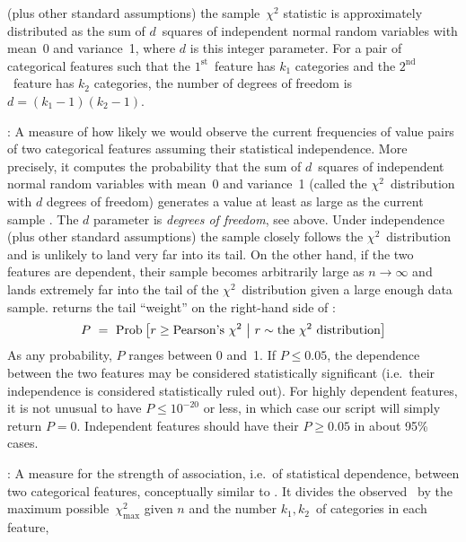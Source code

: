 \begin{Description}
(plus other standard assumptions) the sample~$\chi^2$ statistic is approximately distributed as the
sum of $d$~squares of independent normal random variables with mean~0 and variance~1, where $d$ is
this integer parameter.  For a pair of categorical features such that the $1^{\textrm{st}}$~feature
has $k_1$ categories and the $2^{\textrm{nd}}$~feature has $k_2$ categories, the number of degrees
of freedom is $d = (k_1 - 1)(k_2 - 1)$.
\item[\it\NameStatPChi]:
A measure of how likely we would observe the current frequencies of value pairs of two categorical
features assuming their statistical independence.  More precisely, it computes the probability that
the sum of $d$~squares of independent normal random variables with mean~0 and variance~1
(called the $\chi^2$~distribution with $d$ degrees of freedom) generates a value at least as large
as the current sample \NameStatChi.  The $d$ parameter is \emph{degrees of freedom}, see above.
Under independence (plus other standard assumptions) the sample \NameStatChi{} closely follows the
$\chi^2$~distribution and is unlikely to land very far into its tail.  On the other hand, if the
two features are dependent, their sample \NameStatChi{} becomes arbitrarily large as $n\to\infty$
and lands extremely far into the tail of the $\chi^2$~distribution given a large enough data sample.
\NameStatPChi{} returns the tail ``weight'' on the right-hand side of \NameStatChi:
\begin{equation*}
P\,\,=\,\, \mathop{\mathrm{Prob}\hspace{0.5pt}}\nolimits\big[r \geq \textrm{Pearson's~$\chi^2$} \,\,\big|\,\, r \sim \textrm{the $\chi^2$ distribution}\big]
\end{equation*}
As any probability, $P$ ranges between 0 and~1.  If $P\leq 0.05$, the dependence between the two
features may be considered statistically significant (i.e.\ their independence is considered
statistically ruled out).  For highly dependent features, it is not unusual to have $P\leq 10^{-20}$
or less, in which case our script will simply return $P = 0$.  Independent features should have
their $P\geq 0.05$ in about 95\% cases.
\item[\it\NameStatV]:
A measure for the strength of association, i.e.\ of statistical dependence, between two categorical
features, conceptually similar to \NameStatR.  It divides the observed~\NameStatChi{} by the maximum
possible~$\chi^2_{\textrm{max}}$ given $n$ and the number $k_1, k_2$~of categories in each feature,

\end{Description}
